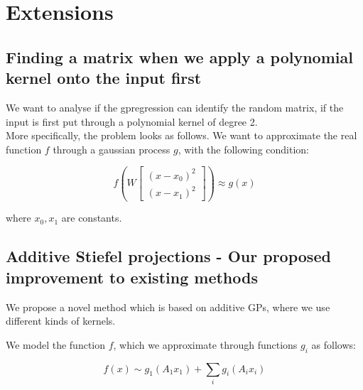 \chapter{Extensions}

\ifpdf
    \graphicspath{{Chapter3/Figs/Raster/}{Chapter3/Figs/PDF/}{Chapter3/Figs/}}
\else
    \graphicspath{{Chapter3/Figs/Vector/}{Chapter3/Figs/}}
\fi

\section{Finding a matrix when we apply a polynomial kernel onto the input first}
We want to analyse if the gpregression can identify the random matrix, if the input is first put through a polynomial kernel of degree 2. \\

More specifically, the problem looks as follows.
We want to approximate the real function $ f $ through a gaussian process $ g $, with the following condition:

\def\B{
\begin{bmatrix}
    (x - x_0)^2 \\
    (x - x_1)^2
\end{bmatrix}}

\begin{equation}
f \left( W \B \right) \approx g \left( x \right)
\end{equation} 

where $x_0, x_1$ are constants.

\section{Additive Stiefel projections - Our proposed improvement to existing methods}
We propose a novel method which is based on additive GPs, where we use different kinds of kernels.

We model the function $f$, which we approximate through functions $g_{i}$ as follows:

\begin{equation}
f(x) \sim g_1(A_1 x_1) + \sum_{i} g_i(A_i x_i)
\end{equation}

